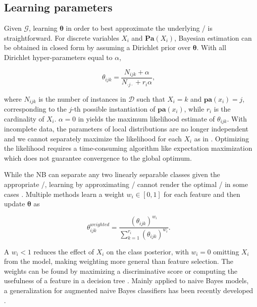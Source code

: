 \subsection{Learning parameters}\label{learning-parameters}

Given \(\mathcal{G}\), learning \(\boldsymbol{\theta}\) in order to best
approximate the underlying \PCX/ is straightforward. For discrete
variables \(X_i\) and \(\mathbf{Pa}(X_i)\), Bayesian estimation can be
obtained in closed form by assuming a Dirichlet prior over
\(\boldsymbol{\theta}\). With all Dirichlet hyper-parameters equal to
\(\alpha\),

\begin{equation}
\theta_{ijk} = \frac{N_{ijk} + \alpha}{N_{ \cdot j \cdot } + r_i \alpha},
\label{eq:disparams}
\end{equation}

\noindent where \(N_{ijk}\) is the number of instances in
\(\mathcal{D}\) such that \(X_i = k\) and \(\mathbf{pa}(x_i) = j\),
corresponding to the \(j\)-th possible instantiation of
\(\mathbf{pa}(x_i)\), while \(r_i\) is the cardinality of \(X_i\).
\(\alpha = 0\) in  yields the maximum likelihood estimate
of \(\theta_{ijk}\). With incomplete data, the parameters of local
distributions are no longer independent and we cannot separately
maximize the likelihood for each \(X_i\) as in .
Optimizing the likelihood requires a time-consuming algorithm like
expectation maximization \citep{Dempster1977} which does not guarantee
convergence to the global optimum.

While the NB can separate any two linearly separable classes given the
appropriate \mthetas/, learning by approximating \PCX/ cannot render the
optimal \mthetas/ in some cases \citep{jaeger2003}. Multiple methods
\citep{Hall2007,Zaidi2013,Zaidi2017} learn a weight \(w_i \in [0,1]\)
for each feature and then update \(\boldsymbol{\theta}\) as

\begin{equation*}
  \theta_{ijk}^{weighted} = \frac{(\theta_{ijk})^{w_i}}{\sum_{k=1}^{r_i} (\theta_{ijk})^{w_i}}.
\end{equation*}

\noindent A \(w_i < 1\) reduces the effect of \(X_i\) on the class
posterior, with \(w_i = 0\) omitting \(X_i\) from the model, making
weighting more general than feature selection. The weights can be found
by maximizing a discriminative score \citep{Zaidi2013} or computing the
usefulness of a feature in a decision tree \citep{Hall2007}. Mainly
applied to naive Bayes models, a generalization for augmented naive
Bayes classifiers has been recently developed \citep{Zaidi2017}.

